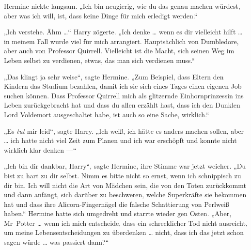 Hermine nickte langsam.
„Ich bin neugierig, wie du das genau machen würdest, aber was ich will, ist, dass keine Dinge für mich erledigt werden.“

„Ich verstehe. Ähm …“ Harry zögerte.
„Ich denke … wenn es dir vielleicht hilft … in meinem Fall wurde viel für mich arrangiert. Hauptsächlich von Dumbledore, aber auch von Professor Quirrell. Vielleicht ist die Macht, sich seinen Weg im Leben selbst zu verdienen, etwas, das man sich verdienen muss.“

„Das klingt ja sehr weise“, sagte Hermine.
„Zum Beispiel, dass Eltern den Kindern das Studium bezahlen, damit ich sie sich eines Tages einen eigenen Job suchen können. Dass Professor Quirrell mich als glitzernde Einhornprinzessin ins Leben zurückgebracht hat und dass du allen erzählt hast, dass ich den Dunklen Lord Voldemort ausgeschaltet habe, ist auch so eine Sache, wirklich.“

„Es \emph{tut} mir leid“, sagte Harry.
„Ich weiß, ich hätte es anders machen sollen, aber … ich hatte nicht viel Zeit zum Planen und ich war erschöpft und konnte nicht wirklich klar denken —“

„Ich bin dir dankbar, Harry“, sagte Hermine, ihre Stimme war jetzt weicher.
„Du bist zu hart zu dir selbst. Nimm es bitte nicht so ernst, wenn ich schnippisch zu dir bin. Ich will nicht die Art von Mädchen sein, die von den Toten zurückkommt und dann anfängt, sich darüber zu beschweren, welche Superkräfte sie bekommen hat und dass ihre Alicorn-Fingernägel die falsche Schattierung von Perlweiß haben.“ Hermine hatte sich umgedreht und starrte wieder gen Osten.
„Aber, Mr~Potter … wenn ich mich entscheide, dass ein schrecklicher Tod nicht ausreicht, um meine Lebensentscheidungen zu überdenken … nicht, dass ich das jetzt schon sagen würde … was passiert dann?“

